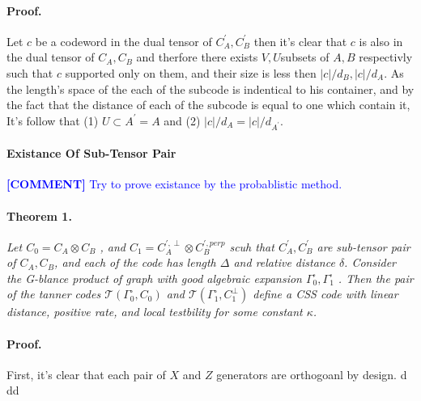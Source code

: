 \documentclass{article}
\newcommand{\commentt}[1]{\textcolor{blue}{ \textbf{[COMMENT]} #1}}
\newcommand{\ctt}[1]{\commentt{#1}}
\begin{document}
\begin{multicols*}{2}
 \paragraph{Proof.} Let $c$ be a codeword in the dual tensor of $C_{A}^{\prime},C_{B}^{\prime}$ then it's clear that $c$ is also in the dual tensor of $C_{A}, C_{B}$ and therfore there exists $V,U$subsets of $A,B$ respectivly such that $c$ supported only on them, and their size is less then $|c|/d_{B}, |c|/d_{A}$. As the length's space of the each of the subcode is indentical to his container, and by the fact that the distance of each of the subcode is equal to one which contain it, It's follow that (1) $U \subset A^\prime = A $ and (2) $|c|/d_{A}=|c|/d_{A^\prime}$. 

 \paragraph{Existance Of Sub-Tensor Pair } \ctt{ Try to prove existance by the probablistic method.} 
 \paragraph{Theorem 1.} \textit{ Let $C_{0} = C_{A}\otimes C_{B}$ , and $C_{1} = C_{A}^{\prime, \perp} \otimes C_{B}^{\prime, perp}$ scuh that $C_{A}^\prime, C_{B}^\prime$ are sub-tensor pair of $C_{A},C_{B}$, and each of the code has length $\Delta$ and relative distance $\delta$. Consider the G-blance product of graph with good algebraic expansion $\Gamma^{\square}_{0},\Gamma^{\square}_{1}$ . Then the pair of the tanner codes $\mathcal{T}\left( \Gamma^{\square}_{0}, C_0 \right)$ and  $\mathcal{T}\left( \Gamma^{\square}_{1}, C_{1}^{\perp} \right)$ define a CSS code with linear distance, positive rate, and local testbility for some constant $\kappa$.} 

 \paragraph{Proof.} First, it's clear that each pair of $X$ and $Z$ generators are orthogoanl by design. d dd     
\end{multicols*}
\end{document}
